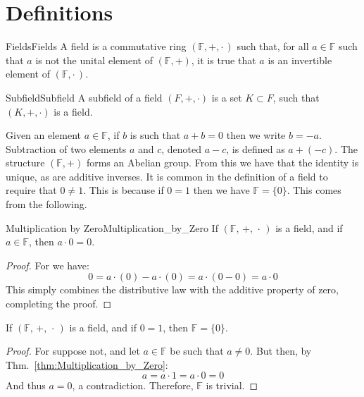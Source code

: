 \section{Definitions}
    \begin{fdefinition}{Fields}{Fields}
        A field is a commutative ring $(\mathbb{F},+,\cdot\,)$ such that, for
        all $a\in\mathbb{F}$ such that $a$ is not the unital element of
        $(\mathbb{F},+)$, it is true that $a$ is an invertible element of
        $(\mathbb{F},\cdot\,)$.
    \end{fdefinition}
    \begin{fdefinition}{Subfield}{Subfield}
        A subfield of a field $(F,+,\cdot)$ is a set $K\subset F$, such that
        $(K,+,\cdot)$ is a field.
    \end{fdefinition}
    Given an element $a\in\mathbb{F}$, if $b$ is such that
    $a+b=0$ then we write $b=\minus{a}$. Subtraction of two elements
    $a$ and $c$, denoted $a-c$, is defined as $a+(\minus{c})$. The
    structure $(\mathbb{F},+)$ forms an Abelian group. From this we have
    that the identity is unique, as are additive inverses.
    It is common in the definition of a field to require that
    $0\ne{1}$. This is because if $0=1$ then we have $\mathbb{F}=\{0\}$.
    This comes from the following.
    \begin{ltheorem}{Multiplication by Zero}{Multiplication_by_Zero}
        If $(\mathbb{F},\,+,\,\cdot\,)$ is a field, and if $a\in\mathbb{F}$,
        then $a\cdot{0}=0$.
    \end{ltheorem}
    \begin{proof}
        For we have:
        \begin{equation}
            0=a\cdot(0)-a\cdot(0)=a\cdot(0-0)=a\cdot{0}
        \end{equation}
        This simply combines the distributive law with the additive
        property of zero, completing the proof.
    \end{proof}
    \begin{theorem}
        If $(\mathbb{F},\,+,\,\cdot\,)$ is a field, and if $0=1$, then
        $\mathbb{F}=\{0\}$.
    \end{theorem}
    \begin{proof}
        For suppose not, and let $a\in\mathbb{F}$ be such that $a\ne{0}$.
        But then, by Thm.~\ref{thm:Multiplication_by_Zero}:
        \begin{equation}
            a=a\cdot{1}=a\cdot{0}=0
        \end{equation}
        And thus $a=0$, a contradiction. Therefore,
        $\mathbb{F}$ is trivial.
    \end{proof}
